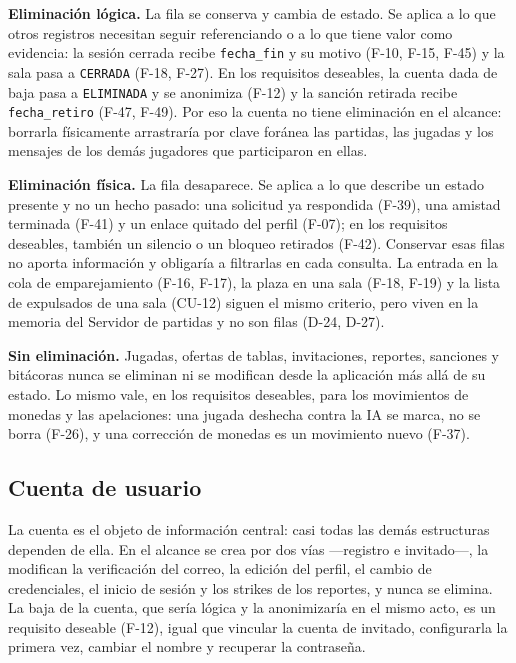 \begin{reglas}
  \item \textbf{Eliminación lógica.} La fila se conserva y cambia de estado. Se aplica a lo que otros registros necesitan seguir referenciando o a lo que tiene valor como evidencia: la sesión cerrada recibe \texttt{fecha\_\allowbreak{}fin} y su motivo (\mbox{F-10}, \mbox{F-15}, \mbox{F-45}) y la sala pasa a \texttt{CERRADA} (\mbox{F-18}, \mbox{F-27}). En los requisitos deseables, la cuenta dada de baja pasa a \texttt{ELIMINADA} y se anonimiza (\mbox{F-12}) y la sanción retirada recibe \texttt{fecha\_\allowbreak{}retiro} (\mbox{F-47}, \mbox{F-49}). Por eso la cuenta no tiene eliminación en el alcance: borrarla físicamente arrastraría por clave foránea las partidas, las jugadas y los mensajes de los demás jugadores que participaron en ellas.
  \item \textbf{Eliminación física.} La fila desaparece. Se aplica a lo que describe un estado presente y no un hecho pasado: una solicitud ya respondida (\mbox{F-39}), una amistad terminada (\mbox{F-41}) y un enlace quitado del perfil (\mbox{F-07}); en los requisitos deseables, también un silencio o un bloqueo retirados (\mbox{F-42}). Conservar esas filas no aporta información y obligaría a filtrarlas en cada consulta. La entrada en la cola de emparejamiento (\mbox{F-16}, \mbox{F-17}), la plaza en una sala (\mbox{F-18}, \mbox{F-19}) y la lista de expulsados de una sala (\mbox{CU-12}) siguen el mismo criterio, pero viven en la memoria del Servidor de partidas y no son filas (\mbox{D-24}, \mbox{D-27}).
  \item \textbf{Sin eliminación.} Jugadas, ofertas de tablas, invitaciones, reportes, sanciones y bitácoras nunca se eliminan ni se modifican desde la aplicación más allá de su estado. Lo mismo vale, en los requisitos deseables, para los movimientos de monedas y las apelaciones: una jugada deshecha contra la IA se marca, no se borra (\mbox{F-26}), y una corrección de monedas es un movimiento nuevo (\mbox{F-37}).
\end{reglas}

\subsection*{Cuenta de usuario}

La cuenta es el objeto de información central: casi todas las demás estructuras dependen de ella. En el alcance se crea por dos vías —registro e invitado—, la modifican la verificación del correo, la edición del perfil, el cambio de credenciales, el inicio de sesión y los strikes de los reportes, y nunca se elimina. La baja de la cuenta, que sería lógica y la anonimizaría en el mismo acto, es un requisito deseable (\mbox{F-12}), igual que vincular la cuenta de invitado, configurarla la primera vez, cambiar el nombre y recuperar la contraseña.

